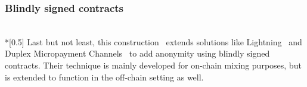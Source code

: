 \subsubsection{Blindly signed contracts} \ \\*[0.5\baselineskip]
  Last but not least, this construction~\cite{blindsigncoins} extends solutions like
  Lightning~\cite{lightning} and Duplex Micropayment Channels~\cite{duplexchannels} to add
  anonymity using blindly signed contracts. Their technique is mainly developed for
  on-chain mixing purposes, but is extended to function in the off-chain setting as well.
